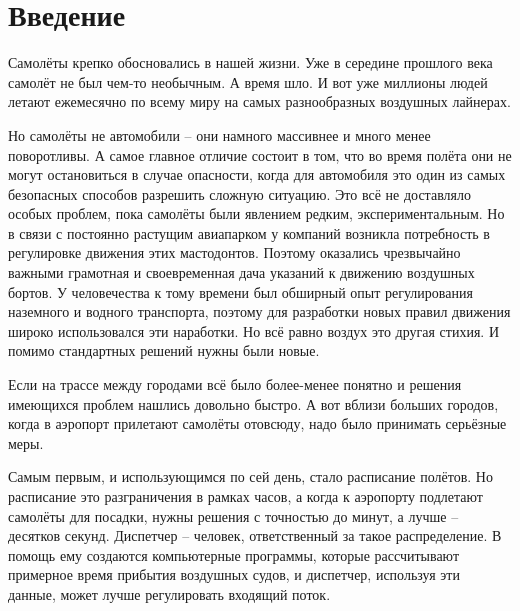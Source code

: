 \documentclass[12pt, a4 paper]{article}
\theoremstyle{plain}
\begin{document}


\tableofcontents

\pagestyle{empty} %
\setcounter{page}{2}

\newpage



\section*{Введение}
\pagestyle{plain} %

Самолёты крепко обосновались в нашей жизни. Уже в середине прошлого века самолёт не был чем-то необычным. А время шло. И вот уже миллионы людей летают ежемесячно по всему миру на самых разнообразных воздушных лайнерах.

Но самолёты не автомобили – они намного массивнее и много менее поворотливы. А самое главное отличие состоит в том, что во время полёта они не могут остановиться в случае опасности, когда для автомобиля это один из самых безопасных способов разрешить сложную ситуацию. Это всё не доставляло особых проблем, пока самолёты были явлением редким, экспериментальным. Но в связи с постоянно растущим авиапарком у компаний возникла потребность в регулировке движения этих мастодонтов. Поэтому оказались чрезвычайно важными грамотная и своевременная дача указаний к движению воздушных бортов. У человечества к тому времени был обширный опыт регулирования наземного и водного транспорта, поэтому для разработки новых правил движения широко использовался эти наработки. Но всё равно воздух это другая стихия. И помимо стандартных решений нужны были новые.

Если на трассе между городами всё было более-менее понятно и решения имеющихся проблем нашлись довольно быстро. А вот вблизи больших городов, когда в аэропорт прилетают самолёты отовсюду, надо было принимать серьёзные меры.

Самым первым, и использующимся по сей день, стало расписание полётов. Но расписание это разграничения в рамках часов, а когда к аэропорту подлетают самолёты для посадки, нужны решения с точностью до минут, а лучше – десятков секунд. Диспетчер – человек, ответственный за такое распределение.  В помощь ему создаются компьютерные программы, которые рассчитывают примерное время прибытия воздушных судов, и диспетчер, используя эти данные, может лучше регулировать входящий поток.
\end{document}
